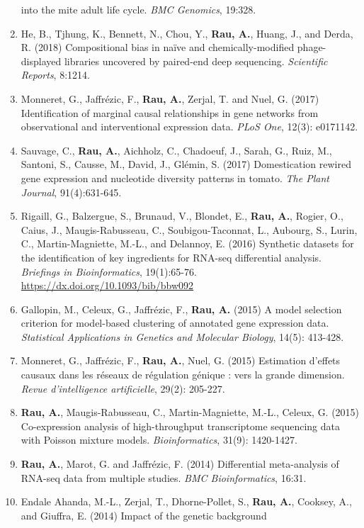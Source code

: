 \documentclass[11pt, a4paper]{awesome-cv}
\begin{document}
\begin{enumerate}
  into the mite adult life cycle. \emph{BMC Genomics}, 19:328.
\item
  He, B., Tjhung, K., Bennett, N., Chou, Y., \textbf{Rau, A.}, Huang,
  J., and Derda, R. (2018) Compositional bias in naïve and
  chemically-modified phage-displayed libraries uncovered by paired-end
  deep sequencing. \emph{Scientific Reports}, 8:1214.
\item
  Monneret, G., Jaffrézic, F., \textbf{Rau, A.}, Zerjal, T. and Nuel, G.
  (2017) Identification of marginal causal relationships in gene
  networks from observational and interventional expression data.
  \emph{PLoS One}, 12(3): e0171142.
\item
  Sauvage, C., \textbf{Rau, A.}, Aichholz, C., Chadoeuf, J., Sarah, G.,
  Ruiz, M., Santoni, S., Causse, M., David, J., Glémin, S. (2017)
  Domestication rewired gene expression and nucleotide diversity
  patterns in tomato. \emph{The Plant Journal}, 91(4):631-645.
\item
  Rigaill, G., Balzergue, S., Brunaud, V., Blondet, E., \textbf{Rau,
  A.}, Rogier, O., Caius, J., Maugis-Rabusseau, C., Soubigou-Taconnat,
  L., Aubourg, S., Lurin, C., Martin-Magniette, M.-L., and Delannoy, E.
  (2016) Synthetic datasets for the identification of key ingredients
  for RNA-seq differential analysis. \emph{Briefings in Bioinformatics},
  19(1):65-76. \url{https://dx.doi.org/10.1093/bib/bbw092}
\item
  Gallopin, M., Celeux, G., Jaffrézic, F., \textbf{Rau, A.} (2015) A
  model selection criterion for model-based clustering of annotated gene
  expression data. \emph{Statistical Applications in Genetics and
  Molecular Biology}, 14(5): 413-428.
\item
  Monneret, G., Jaffrézic, F., \textbf{Rau, A.}, Nuel, G. (2015)
  Estimation d'effets causaux dans les réseaux de régulation génique :
  vers la grande dimension. \emph{Revue d'intelligence artificielle},
  29(2): 205-227.
\item
  \textbf{Rau, A.}, Maugis-Rabusseau, C., Martin-Magniette, M.-L.,
  Celeux, G. (2015) Co-expression analysis of high-throughput
  transcriptome sequencing data with Poisson mixture models.
  \emph{Bioinformatics}, 31(9): 1420-1427.
\item
  \textbf{Rau, A.}, Marot, G. and Jaffrézic, F. (2014) Differential
  meta-analysis of RNA-seq data from multiple studies. \emph{BMC
  Bioinformatics}, 16:31.
\item
  Endale Ahanda, M.-L., Zerjal, T., Dhorne-Pollet, S., \textbf{Rau, A.},
  Cooksey, A., and Giuffra, E. (2014) Impact of the genetic background

\end{enumerate}
\end{document}
